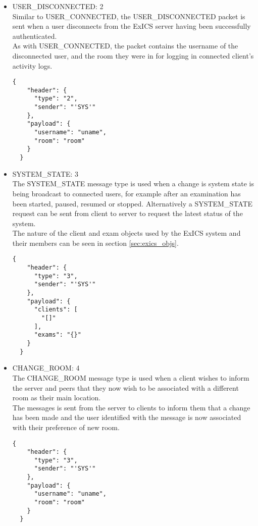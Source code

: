 \begin{itemize}
\item USER\_DISCONNECTED: 2\\
  Similar to USER\_CONNECTED, the USER\_DISCONNECTED packet is sent when a user disconnects from the ExICS server having been successfully authenticated.\\
  As with USER\_CONNECTED, the packet contains the username of the disconnected user, and the room they were in for logging in connected client's activity logs.
  \lstset{language=JSON}
  \begin{lstlisting}[tabsize=2,breaklines=true]
  {
    "header": {
      "type": "2",
      "sender": "'SYS'"
    },
    "payload": {
      "username": "uname",
      "room": "room"
    }
  }
  \end{lstlisting}

\item SYSTEM\_STATE: 3\\
  The SYSTEM\_STATE message type is used when a change is system state is being broadcast to connected users, for example after an examination has been started, paused, resumed or stopped.  Alternatively a SYSTEM\_STATE request can be sent from client to server to request the latest status of the system.\\
  The nature of the client and exam objects used by the ExICS system and their members can be seen in section \ref{sec:exics_objs}.
  \lstset{language=JSON}
  \begin{lstlisting}[tabsize=2,breaklines=true]
  {
    "header": {
      "type": "3",
      "sender": "'SYS'"
    },
    "payload": {
      "clients": [
        "[]"
      ],
      "exams": "{}"
    }
  }
  \end{lstlisting}

\item CHANGE\_ROOM: 4\\
  The CHANGE\_ROOM message type is used when a client wishes to inform the server and peers that they now wish to be associated with a different room as their main location.\\
  The messages is sent from the server to clients to inform them that a change has been made and the user identified with the message is now associated with their preference of new room.
  \lstset{language=JSON}
  \begin{lstlisting}[tabsize=2,breaklines=true]
  {
    "header": {
      "type": "3",
      "sender": "'SYS'"
    },
    "payload": {
      "username": "uname",
      "room": "room"
    }
  }
  \end{lstlisting}


\end{itemize}
